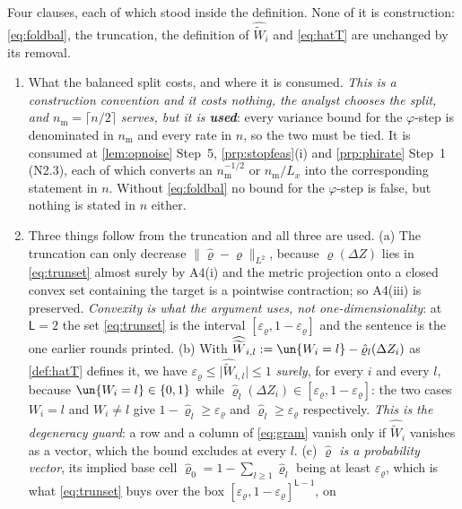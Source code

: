 \begin{remark}\label{rem:hatTread}
Four clauses, each of which stood inside the definition. None of it is construction:
\eqref{eq:foldbal}, the truncation, the definition of $\widehat{\widetilde W}_i$ and \eqref{eq:hatT} are
unchanged by its removal.
\begin{enumerate}
\item[(1)] What the balanced split costs, and where it is consumed.
\emph{This is a construction convention and it costs nothing, the analyst chooses the split, and
$n_{\mathrm m}=\lceil n/2\rceil$ serves, but it is \textbf{used}}: every variance bound for the
$\varphi$-step is
denominated in $n_{\mathrm m}$ and every
rate in $n$, so the two must be tied. It is consumed at \cref{lem:opnoise} Step~5,
\cref{prp:stopfeas}(i) and \cref{prp:phirate} Step~1 (N2.3), each of which converts an
$n_{\mathrm m}^{-1/2}$ or $n_{\mathrm m}/L_x$ into the corresponding statement in $n$. Without
\eqref{eq:foldbal} no bound for the $\varphi$-step is false, but nothing is stated in $n$ either.
\item[(2)] Three things follow from the truncation and all three are used. (a) The truncation can only decrease
$\|\hat\varrho-\varrho\|_{L^{2}}$, because $\varrho(\Delta Z)$ lies in \eqref{eq:trunset}
almost surely by A4(i) and the metric projection onto a closed convex set containing the target
is a pointwise contraction; so A4(iii) is preserved. \emph{Convexity is what the argument uses, not
one-dimensionality}: at $\mathsf L=2$ the set \eqref{eq:trunset} is the interval
$[\varepsilon_\varrho,1-\varepsilon_\varrho]$ and the sentence is the one earlier rounds printed. (b) With
$\widehat{\widetilde W}_{i,l}:=\un\{W_i=l\}-\hat\varrho_l(\Delta Z_i)$ as \cref{def:hatT} defines it, we have
$\varepsilon_\varrho\le\big|\widehat{\widetilde W}_{i,l}\big|\le1$ \emph{surely}, for every $i$ and every
$l$, because $\un\{W_i=l\}\in\{0,1\}$ while $\hat\varrho_l(\Delta Z_i)\in[\varepsilon_\varrho,1-\varepsilon_\varrho]$:
the two cases $W_i=l$ and $W_i\ne l$ give $1-\hat\varrho_l\ge\varepsilon_\varrho$ and
$\hat\varrho_l\ge\varepsilon_\varrho$ respectively. \emph{This is the degeneracy guard}: a row and a
column of \eqref{eq:gram} vanish only if $\widehat{\widetilde W}_i$ vanishes as a vector, which the bound
excludes at every $l$. (c) \emph{$\hat\varrho$ is a probability vector}, its implied base cell
$\hat\varrho_0=1-\sum_{l\ge1}\hat\varrho_l$ being at least $\varepsilon_\varrho$, which is what
\eqref{eq:trunset} buys over the box $[\varepsilon_\varrho,1-\varepsilon_\varrho]^{\mathsf L-1}$, on

\end{enumerate}
\end{remark}
